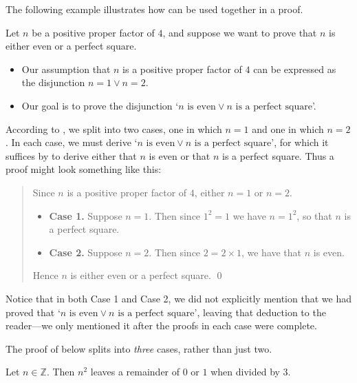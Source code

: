 The following example illustrates how  can be used together in a proof.

\begin{example}
\label{exPositiveProperFactorOfFourEvenOrPerfectSquare}
Let $n$ be a positive proper factor of $4$, and suppose we want to prove that $n$ is either even or a perfect square.
\begin{itemize}
\item Our assumption that $n$ is a positive proper factor of $4$ can be expressed as the disjunction $n = 1 \vee n = 2$.
\item Our goal is to prove the disjunction `$n \text{ is even} \vee n \text{ is a perfect square}$'.
\end{itemize}

According to , we split into two cases, one in which $n=1$ and one in which $n=2$. In each case, we must derive `$n \text{ is even} \vee n \text{ is a perfect square}$', for which it suffices by  to derive either that $n$ is even or that $n$ is a perfect square. Thus a proof might look something like this:

\begin{quote}
Since $n$ is a positive proper factor of $4$, either $n=1$ or $n=2$.
\begin{itemize}
\item \textbf{Case 1.} Suppose $n=1$. Then since $1^2=1$ we have $n = 1^2$, so that $n$ is a perfect square.
\item \textbf{Case 2.} Suppose $n=2$. Then since $2 = 2 \times 1$, we have that $n$ is even.
\end{itemize}
Hence $n$ is either even or a perfect square. \qed
\end{quote}

Notice that in both Case 1 and Case 2, we did not explicitly mention that we had proved that `$n \text{ is even} \vee n \text{ is a perfect square}$', leaving that deduction to the reader---we only mentioned it after the proofs in each case were complete.
\end{example}

The proof of  below splits into \textit{three} cases, rather than just two.

\begin{proposition}
\label{propRemainderOfSquaresModulo3}
Let $n \in \mathbb{Z}$. Then $n^2$ leaves a remainder of $0$ or $1$ when divided by $3$.
\end{proposition}

